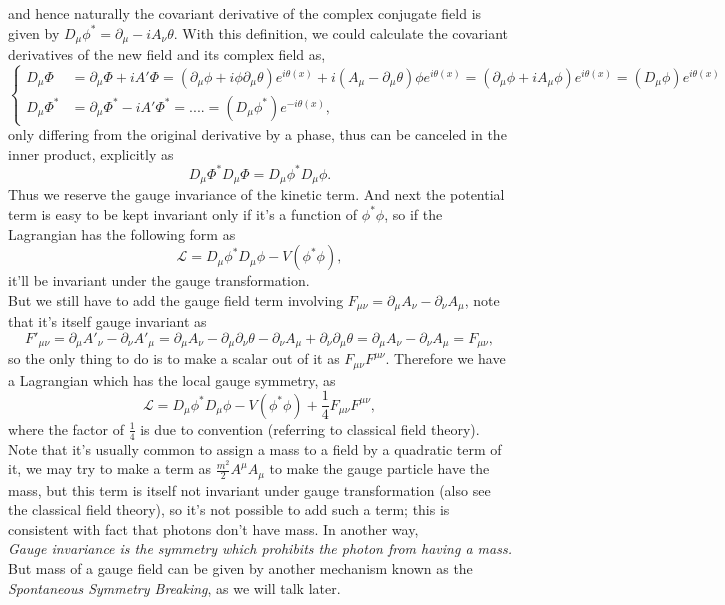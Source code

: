 \documentclass{article}
\newcommand{\be}{\begin{equation}}
\newcommand{\ee}{\end{equation}}
\newcommand{\p}{\partial}
\renewcommand{\1}{\left}
\renewcommand{\2}{\right}
\newcommand{\ma}{\mathcal}
\newcommand{\m}{\mu}
\newcommand{\n}{\nu}
\renewcommand{\th}{\theta}
\begin{document}
and hence naturally the covariant derivative of the complex conjugate field is given by $D_\m\phi^*=\p_\m-iA_\n\th$. With this definition, we could calculate the covariant derivatives of the new field and its complex field as,
\be\1\{\begin{split}
D_\m \Phi&=\p_\m \Phi +iA'\Phi =\1(\p_\m\phi+i\phi\p_\m\th\2)e^{i\th(x)}+i\1(A_\m-\p_\m\th\2)\phi e^{i\th(x)}=\1(\p_\m\phi+iA_\m\phi\2)e^{i\th(x)}=(D_\m\phi) e^{i\th(x)}\\
D_\m \Phi^*&=\p_\m \Phi^* -iA'\Phi^* =....=(D_\m\phi^*) e^{-i\th(x)},
\end{split}\2.\ee
only differing from the original derivative by a phase, thus can be canceled in the inner product, explicitly as
\be
D_\m \Phi^*D_\m \Phi=D_\m \phi^*D_\m \phi.
\ee
Thus we reserve the gauge invariance of the kinetic term. And next the potential term is easy to be kept invariant only if it's a function of $\phi^*\phi$, so if the Lagrangian has the following form as
\be \ma L=D_\m \phi^*D_\m \phi-V(\phi^*\phi), \ee
it'll be invariant under the gauge transformation.\\
But we still have to add the gauge field term involving $F_{\m\n}=\p_\m A_\n-\p_\n A_\m$, note that it's itself gauge invariant as
\be F'_{\m\n}=\p_\m A'_\n-\p_\n A'_\m=\p_\m A_\n-\p_\m\p_\n\th-\p_\n A_\m+\p_\n\p_\m\th=\p_\m A_\n-\p_\n A_\m=F_{\m\n}, \ee
so the only thing to do is to make a scalar out of it as $F_{\m\n}F^{\m\n}$. Therefore we have a Lagrangian which has the local gauge symmetry, as
\be \ma L=D_\m \phi^*D_\m \phi-V(\phi^*\phi)+\frac 1 4 F_{\m\n}F^{\m\n}, \ee
where the factor of $\frac 1 4$ is due to convention (referring to classical field theory). Note that it's usually common to assign a mass to a field by a quadratic term of it, we may try to make a term as $\frac {m^2} 2 A^\m A_\m$ to make the gauge particle have the mass, but this term is itself not invariant under gauge transformation (also see the classical field theory), so it's not possible to add such a term; this is consistent with fact that photons don't have mass. In another way,\\

\textit{Gauge invariance is the symmetry which prohibits the photon from having a mass.}\\

 But mass of a gauge field can be given by another mechanism known as the \textit{Spontaneous Symmetry Breaking}, as we will talk later.
 
\end{document}
